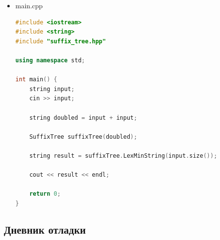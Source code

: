 \documentclass[12pt]{article}
\begin{document}
\begin{itemize}
\begin{lstlisting}[language=C++]
        remainingSuffixCount--;

        if (activeNode == root && activeLength > 0)
        {
            activeLength--;
            activeEdge++;
        }
        else if (activeNode != root)
            activeNode = activeNode->suffix_link;
    }
}

void SuffixTree::CountIndex(Node *node, vector<int> &vec)
{
    if (!node)
        return;
    for (auto it : node->children)
        CountIndex(it.second, vec);
    if (node->suffix_index != -1)
        vec.push_back(node->suffix_index);
}

string SuffixTree::LexMinString(const size_t &n)
{
    vector<int> suffixIndices;
    CountIndex(root, suffixIndices);

    int minIndex = -1; 
    for (const auto &index : suffixIndices)
    {
        if (index < n)
        {
            if (minIndex == -1 || text.compare(index, n, text, minIndex, n) < 0)
            {
                minIndex = index;
            }
        }
    }

    return (minIndex != -1) ? text.substr(minIndex, n) : "";
}
        \end{lstlisting}
        \item
        main.cpp
        \begin{lstlisting}[language=C++]
#include <iostream>
#include <string>
#include "suffix_tree.hpp"

using namespace std;

int main() {
    string input;
    cin >> input;

    string doubled = input + input;

    SuffixTree suffixTree(doubled);

    string result = suffixTree.LexMinString(input.size());

    cout << result << endl;

    return 0;
}

        \end{lstlisting}
\end{itemize}

\subsection*{Дневник отладки}
\end{document}
